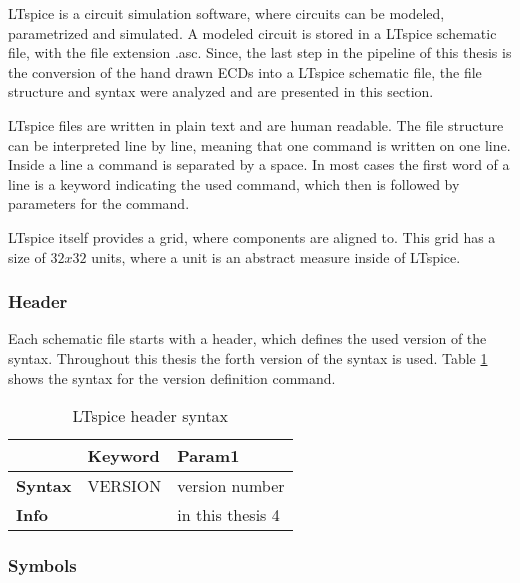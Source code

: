 LTspice is a circuit simulation software, where circuits can be modeled, parametrized and simulated.
A modeled circuit is stored in a LTspice schematic file, with the file extension .asc.
Since, the last step in the pipeline of this thesis is the conversion of the hand drawn \acp{ECD} into a LTspice schematic file, the file structure and syntax were analyzed and are presented in this section.

LTspice files are written in plain text and are human readable.
The file structure can be interpreted line by line, meaning that one command is written on one line.
Inside a line a command is separated by a space.
In most cases the first word of a line is a keyword indicating the used command, which then is followed by parameters for the command.

LTspice itself provides a grid, where components are aligned to.
This grid has a size of $32x32$ units, where a unit is an abstract measure inside of LTspice.

\subsubsection{Header}

Each schematic file starts with a header, which defines the used version of the syntax.
Throughout this thesis the forth version of the syntax is used. Table \ref{tab:ltheader_syntax} shows the syntax for the version definition command.

\begin{table}[H]
\begin{center}

\begin{tabular}{l|l|l}
    & \textbf{Keyword} & \textbf{Param1}\\
    \hline
    \textbf{Syntax} & VERSION & version number\\
    \textbf{Info} & & in this thesis 4
\end{tabular}
\caption{LTspice header syntax}
\label{tab:ltheader_syntax}

\end{center}
\end{table}


\subsubsection{Symbols}

